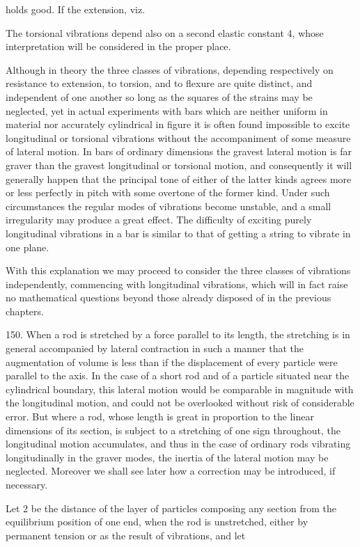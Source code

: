 holds good. If the extension, viz.

The torsional vibrations depend also on a second elastic constant 4,
whose interpretation will be considered in the proper place.

Although in theory the three classes of vibrations, depending
respectively on resistance to extension, to torsion, and to flexure are
quite distinct, and independent of one another so long as the squares of
the strains may be neglected, yet in actual experiments with bars which
are neither uniform in material nor accurately cylindrical in figure it
is often found impossible to excite longitudinal or torsional vibrations
without the accompaniment of some measure of lateral motion. In bars of
ordinary dimensions the gravest lateral motion is far graver than the
gravest longitudinal or torsional motion, and consequently it will
generally happen that the principal tone of either of the latter kinds
agrees more or less perfectly in pitch with some overtone of the former
kind. Under such circumstances the regular modes of vibrations become
unstable, and a small irregularity may produce a great effect. The
difficulty of exciting purely longitudinal vibrations in a bar is
similar to that of getting a string to vibrate in one plane.

With this explanation we may proceed to consider the three classes of
vibrations independently, commencing with longitudinal vibrations, which
will in fact raise no mathematical questions beyond those already
disposed of in the previous chapters.

150. When a rod is stretched by a force parallel to its length, the
stretching is in general accompanied by lateral contraction in such a
manner that the augmentation of volume is less than if the displacement
of every particle were parallel to the axis. In the case of a short rod
and of a particle situated near the cylindrical boundary, this lateral
motion would be comparable in magnitude with the longitudinal motion,
and could not be overlooked without risk of considerable error. But
where a rod, whose length is great in proportion to the linear
dimensions of its section, is subject to a stretching of one sign
throughout, the longitudinal motion accumulates, and thus in the case of
ordinary rods vibrating longitudinally in the graver modes, the inertia
of the lateral motion may be neglected. Moreover we shall see later how
a correction may be introduced, if necessary.

Let 2 be the distance of the layer of particles composing any section
from the equilibrium position of one end, when the rod is unstretched,
either by permanent tension or as the result of vibrations, and let

